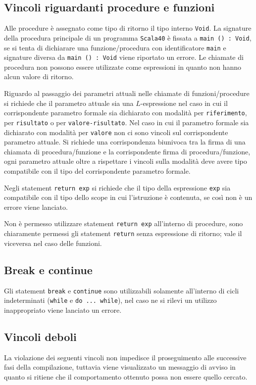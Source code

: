 \subsection*{Vincoli riguardanti procedure e funzioni}
Alle procedure è assegnato come tipo di ritorno il tipo interno \texttt{Void}.
La signature della procedura principale di un programma \texttt{Scala40} è fissata a \texttt{main () : Void}, se si tenta di dichiarare una funzione/procedura con identificatore \texttt{main} e signature diversa da \texttt{main () : Void} viene riportato un errore.
Le chiamate di procedura non possono essere utilizzate come espressioni in quanto non hanno alcun valore di ritorno.

Riguardo al passaggio dei parametri attuali nelle chiamate di funzioni/procedure si richiede che il parametro attuale sia una $L$-espressione nel caso in cui il corrispondente parametro formale sia dichiarato con modalità per \texttt{riferimento}, per \texttt{risultato} o per \texttt{valore-risultato}. Nel caso in cui il parametro formale sia dichiarato con modalità per \texttt{valore} non ci sono vincoli sul corrispondente parametro attuale.
Si richiede una corrispondenza biunivoca tra la firma di una chiamata di procedura/funzione e la corrispondente firma di procedura/funzione, ogni parametro attuale oltre a rispettare i vincoli sulla modalità deve avere tipo compatibile con il tipo del corrispondente parametro formale.

Negli statement \texttt{return exp} si richiede che il tipo della espressione \texttt{exp} sia compatibile con il tipo dello scope in cui l'istruzione è contenuta, se così non è un errore viene lanciato.

Non è permesso utilizzare statement \texttt{return exp} all'interno di procedure, sono chiaramente permessi gli statement \texttt{return} senza espressione di ritorno; vale il viceversa nel caso delle funzioni.

\subsection*{Break e continue}
Gli statement \texttt{break} e \texttt{continue} sono utilizzabili solamente all'interno di cicli indeterminati (\texttt{while} e \texttt{do ... while}), nel caso ne si rilevi un utilizzo inappropriato viene lanciato un errore.

\subsection*{Vincoli deboli}
La violazione dei seguenti vincoli non impedisce il proseguimento alle successive fasi della compilazione, tuttavia viene visualizzato un messaggio di avviso in quanto si ritiene che il comportamento ottenuto possa non essere quello cercato.

